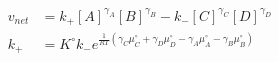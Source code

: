 \begin{eqnarray}
v_{net} & = k_+[A]^{\gamma_A}[B]^{\gamma_B} - k_-[C]^{\gamma_C}[D]^{\gamma_D} \\
k_+ &= K^\circ k_-e^{\frac{1}{RT}\left(\gamma_C\mu_C^\circ+ \gamma_D\mu_D^\circ -\gamma_A\mu_A^\circ-\gamma_B\mu_B^\circ\right)} \\
\end{eqnarray}